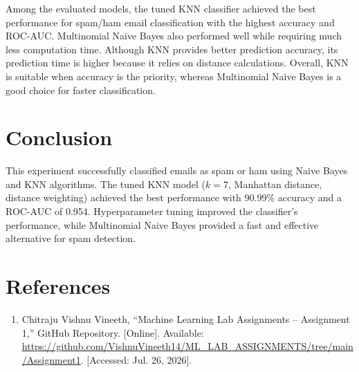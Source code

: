 \documentclass[12pt,a4paper]{article}
\begin{document}
Among the evaluated models, the tuned KNN classifier achieved the best performance for spam/ham email classification with the highest accuracy and ROC-AUC. Multinomial Naive Bayes also performed well while requiring much less computation time. Although KNN provides better prediction accuracy, its prediction time is higher because it relies on distance calculations. Overall, KNN is suitable when accuracy is the priority, whereas Multinomial Naive Bayes is a good choice for faster classification.

\section{Conclusion}

This experiment successfully classified emails as spam or ham using Naive Bayes and KNN algorithms. The tuned KNN model ($k=7$, Manhattan distance, distance weighting) achieved the best performance with 90.99\% accuracy and a ROC-AUC of 0.954. Hyperparameter tuning improved the classifier's performance, while Multinomial Naive Bayes provided a fast and effective alternative for spam detection.

\section{References}
\begin{enumerate}

\item  Chitraju Vishnu Vineeth, ``Machine Learning Lab Assignments -- Assignment 1,'' GitHub Repository. [Online]. Available: \url{https://github.com/VishnuVineeth14/ML_LAB_ASSIGNMENTS/tree/main/Assignment1}. [Accessed: Jul. 26, 2026].
\end{enumerate}
\end{document}
